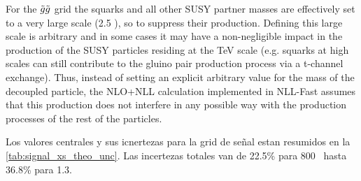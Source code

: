 
For the $\tilde{g}\tilde{g}$ grid the squarks and all other SUSY partner masses are effectively set to
a very large scale (2.5 \TeV), so to suppress their production. Defining this large scale is arbitrary and in some cases it may
have a non-negligible impact in the production of the SUSY particles residing at the TeV scale (e.g. squarks at
high scales can still contribute to the gluino pair production process via a t-channel exchange). Thus, instead of
setting an explicit arbitrary value for the mass of the decoupled particle, the NLO+NLL calculation implemented
in {\sc NLL-Fast} assumes that this production does not interfere in any possible way with the production processes of
the rest of the particles.

Los valores centrales y sus icnertezas para la grid de se\~nal
estan resumidos en la {\tab} \ref{tab:signal_xs_theo_unc}.
Las incertezas totales van de 22.5\% para 800 \GeV\ hasta 36.8\% para 1.3\TeV.

